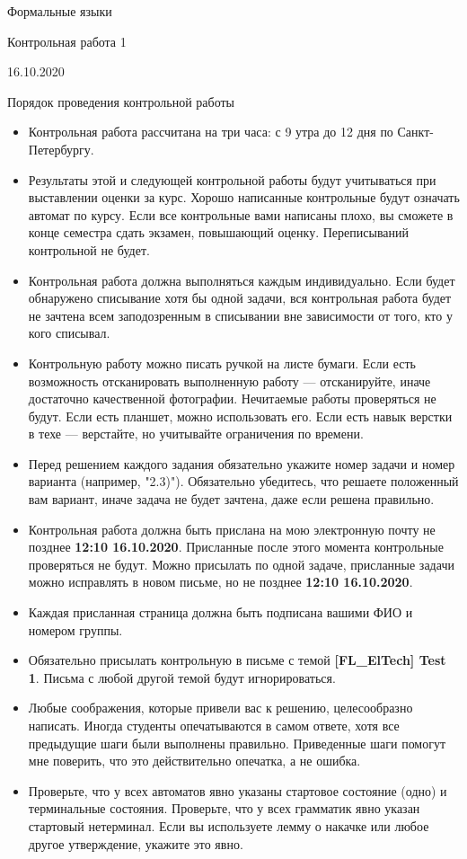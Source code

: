 \documentclass[12pt]{article}
\begin{document}
\begin{center}
{\LARGE Формальные языки}

{\Large Контрольная работа 1}

{\large 16.10.2020}
\end{center}

\bigskip

\begin{center}
  \LARGE Порядок проведения контрольной работы
\end{center}

\begin{itemize}
  \item Контрольная работа рассчитана на три часа: с 9 утра до 12 дня по Санкт-Петербургу.
  \item Результаты этой и следующей контрольной работы будут учитываться при выставлении оценки за курс. Хорошо написанные контрольные будут означать автомат по курсу. Если все контрольные вами написаны плохо, вы сможете в конце семестра сдать экзамен, повышающий оценку. Переписываний контрольной не будет.
  \item Контрольная работа должна выполняться каждым индивидуально. Если будет обнаружено списывание хотя бы одной задачи, вся контрольная работа будет не зачтена всем заподозренным в списывании вне зависимости от того, кто у кого списывал.
  \item Контрольную работу можно писать ручкой на листе бумаги. Если есть возможность отсканировать выполненную работу --- отсканируйте, иначе достаточно качественной фотографии. Нечитаемые работы проверяться не будут. Если есть планшет, можно использовать его. Если есть навык верстки в техе --- верстайте, но учитывайте ограничения по времени.
  \item Перед решением каждого задания обязательно укажите номер задачи и номер варианта (например, "2.3)"). Обязательно убедитесь, что решаете положенный вам вариант, иначе задача не будет зачтена, даже если решена правильно.
  \item Контрольная работа должна быть прислана на мою электронную почту не позднее \textbf{12:10 16.10.2020}. Присланные после этого момента контрольные проверяться не будут. Можно присылать по одной задаче, присланные задачи можно исправлять в новом письме, но не позднее  \textbf{12:10 16.10.2020}.
  \item Каждая присланная страница должна быть подписана вашими ФИО и номером группы.
  \item Обязательно присылать контрольную в письме с темой \textbf{[FL\_ElTech] Test 1}. Письма с любой другой темой будут игнорироваться.
  \item Любые соображения, которые привели вас к решению, целесообразно написать. Иногда студенты опечатываются в самом ответе, хотя все предыдущие шаги были выполнены правильно. Приведенные шаги помогут мне поверить, что это действительно опечатка, а не ошибка.
  \item Проверьте, что у всех автоматов явно указаны стартовое состояние (одно) и терминальные состояния. Проверьте, что у всех грамматик явно указан стартовый нетерминал. Если вы используете лемму о накачке или любое другое утверждение, укажите это явно.
\end{itemize}
\end{document}
